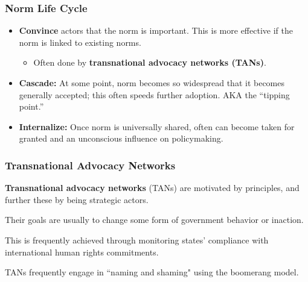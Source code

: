 \documentclass{beamer}
\begin{document}
\begin{frame} 
	\frametitle{\LARGE{Norm Life Cycle}}
	\begin{itemize}
		\item \textbf{Convince} actors that the norm is important. This is more effective if the norm is linked to existing norms. \pause
		\begin{itemize}
			\item Often done by \textbf{transnational advocacy networks (TANs)}. \pause
		\end{itemize}
		\item \textbf{Cascade:}	At some point, norm becomes so widespread that it becomes generally accepted; this often speeds further adoption. AKA the ``tipping point.” \pause
		\item \textbf{Internalize:} Once norm is universally shared, often can become taken for granted and an unconscious influence on policymaking.		
	\end{itemize}
\end{frame}

\begin{frame} 
	\frametitle{\LARGE{Transnational Advocacy Networks}}
	\begin{itemize}
		\large{
			\item \textbf{Transnational advocacy networks} (TANs) are motivated by principles, and further these by being strategic actors. \pause
			\item Their goals are usually to change some form of government behavior or inaction. \pause 

			\item This is frequently achieved through monitoring states' compliance with international human rights commitments. \pause 

			\item TANs frequently engage in ``naming and shaming" using the boomerang model.
		}
	\end{itemize}
\end{frame}
\end{document}
